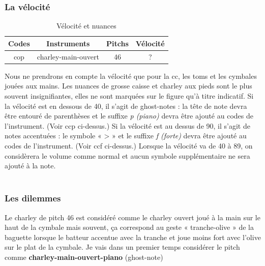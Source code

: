 \subsubsection{La vélocité}
\begin{table}[h]
	\centering
	\begin{tabular}{|c|c|c|c|} \hline
		Codes & Instruments & Pitchs & Vélocité \\ \hline
		cop & charley-main-ouvert & 46 & ? \\ \hline
	\end{tabular}
	\caption{Vélocité et nuances}
\end{table}
Nous ne prendrons en compte la vélocité que pour la cc, les toms et les cymbales jouées aux mains. Les nuances de grosse caisse et charley aux pieds sont le plus souvent insignifiantes, elles ne sont marquées sur le figure qu’à titre indicatif.
Si la vélocité est en dessous de 40, il s’agit de ghost-notes : la tête de note devra être entouré de parenthèses et le suffixe \textit{p (piano)} devra être ajouté au codes de l’instrument. (Voir ccp ci-dessus.)
Si la vélocité est au dessus de 90, il s’agit de notes accentuées : le symbole « > » et le suffixe \textit{f (forte)} devra être ajouté au codes de l’instrument. (Voir ccf ci-dessus.)
Lorsque la vélocité va de 40 à 89, on considèrera le volume comme normal et aucun symbole supplémentaire ne sera ajouté à la note.\\\\

\subsubsection{Les dilemmes}
Le charley de pitch 46 est considéré comme le charley ouvert joué à la main sur le haut de la cymbale mais souvent, ça correspond au geste « tranche-olive » de la baguette lorsque le batteur accentue avec la tranche et joue moins fort avec l’olive sur le plat de la cymbale. Je vais dans un premier temps considérer le pitch comme \textbf{charley-main-ouvert-piano} (ghost-note)
\newpage
